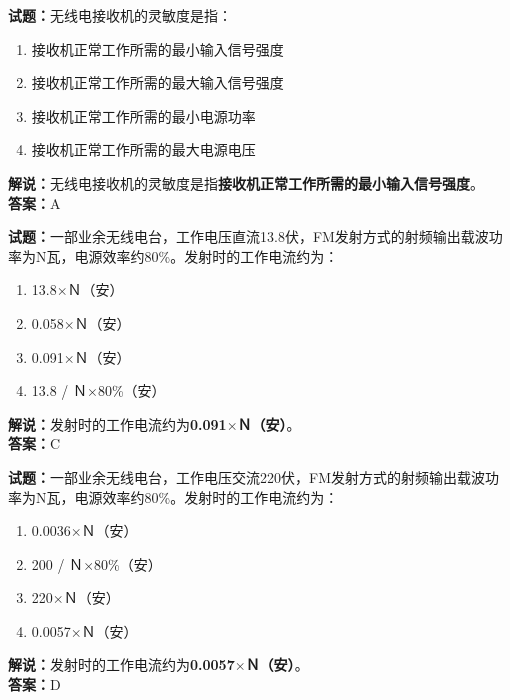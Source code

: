 \documentclass{ctexbook}
\begin{document}
\bigskip


\noindent\textbf{试题：}无线电接收机的灵敏度是指：
\begin{enumerate}[leftmargin=3em]
\item 接收机正常工作所需的最小输入信号强度
\item 接收机正常工作所需的最大输入信号强度
\item 接收机正常工作所需的最小电源功率
\item 接收机正常工作所需的最大电源电压
\end{enumerate}
\noindent\textbf{解说：}无线电接收机的灵敏度是指\textbf{接收机正常工作所需的最小输入信号强度}。\\\noindent\textbf{答案：}A



\bigskip


\noindent\textbf{试题：}一部业余无线电台，工作电压直流13.8伏，FM发射方式的射频输出载波功率为N瓦，电源效率约80\%。发射时的工作电流约为：
\begin{enumerate}[leftmargin=3em]
\item 13.8$\times$Ｎ（安）
\item 0.058$\times$Ｎ（安）
\item 0.091$\times$Ｎ（安）
\item 13.8 / Ｎ$\times$80\%（安）%
\end{enumerate}
\noindent\textbf{解说：}发射时的工作电流约为\textbf{0.091$\times$Ｎ（安）}。\\\noindent\textbf{答案：}C




\bigskip


\noindent\textbf{试题：}一部业余无线电台，工作电压交流220伏，FM发射方式的射频输出载波功率为N瓦，电源效率约80\%。发射时的工作电流约为：
\begin{enumerate}[leftmargin=3em]
\item 0.0036$\times$Ｎ（安）
\item 200 / Ｎ$\times$80\%（安）%
\item 220$\times$Ｎ（安）
\item 0.0057$\times$Ｎ（安）
\end{enumerate}
\noindent\textbf{解说：}发射时的工作电流约为\textbf{0.0057$\times$Ｎ（安）}。\\\noindent\textbf{答案：}D




\bigskip
\end{document}
